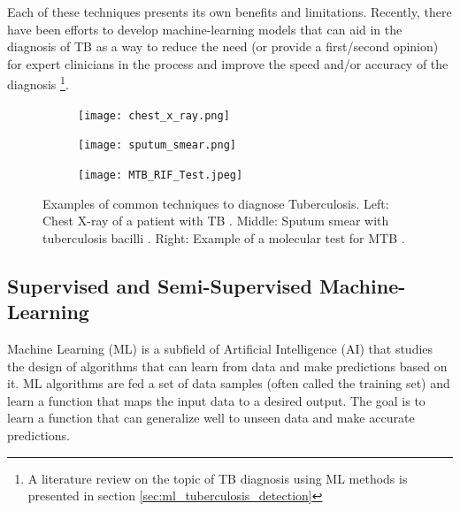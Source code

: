 \documentclass[../main.tex]{subfiles}
\begin{document}
    Each of these techniques presents its own benefits and limitations. Recently, there have been efforts to develop machine-learning models that can aid in the diagnosis of TB as a way to reduce the need (or provide a first/second opinion) for expert clinicians in the process and improve the speed and/or accuracy of the diagnosis \footnote{A literature review on the topic of TB diagnosis using ML methods is presented in section \ref{sec:ml_tuberculosis_detection}}.

    \begin{figure}
        \begin{subfigure}{130px}
          \centering
            \texttt{[image: chest\_x\_ray.png]}
          \label{fig:chest_x_ray_example}
        \end{subfigure}%
        \begin{subfigure}{130px}
          \centering
          \texttt{[image: sputum\_smear.png]}
          \label{fig:sputum_smear_exmaple}
        \end{subfigure}
        \begin{subfigure}{130px}
          \centering
          \texttt{[image: MTB\_RIF\_Test.jpeg]}
          \label{fig:molecular_test_example}
        \end{subfigure}
        \caption{
            Examples of common techniques to diagnose Tuberculosis.
            Left: Chest X-ray of a patient with TB \cite{ubaidi_radiological_nodate}. Middle: Sputum smear with tuberculosis bacilli \cite{shah_ziehlneelsen_2017}. Right: Example of a molecular test for MTB \cite{boehme_rapid_2010}.
        }
        \label{fig:tuberculosis_diagnosis_examples}
    \end{figure}
    
    \subsection{Supervised and Semi-Supervised Machine-Learning} \label{sec:supervised_ml}

    Machine Learning (ML) is a subfield of Artificial Intelligence (AI) that studies the design of algorithms that can learn from data and make predictions based on it. ML algorithms are fed a set of data samples (often called the training set) and learn a function that maps the input data to a desired output. The goal is to learn a function that can generalize well to unseen data and make accurate predictions. 
\end{document}

